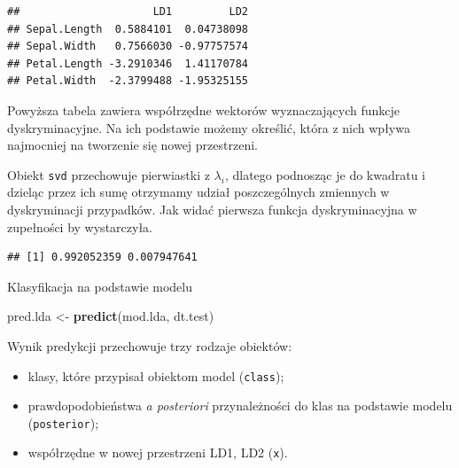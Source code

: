 \documentclass[
]{book}
\newenvironment{Shaded}{\begin{snugshade}}{\end{snugshade}}
\newcommand{\DecValTok}[1]{\textcolor[rgb]{0.00,0.00,0.81}{#1}}
\newcommand{\FunctionTok}[1]{\textcolor[rgb]{0.13,0.29,0.53}{\textbf{#1}}}
\newcommand{\NormalTok}[1]{#1}
\newcommand{\OtherTok}[1]{\textcolor[rgb]{0.56,0.35,0.01}{#1}}
\newcommand{\SpecialCharTok}[1]{\textcolor[rgb]{0.81,0.36,0.00}{\textbf{#1}}}
\providecommand{\tightlist}{%
  \setlength{\itemsep}{0pt}\setlength{\parskip}{0pt}}
\theoremstyle{plain}
\theoremstyle{definition}
\theoremstyle{definition}
\theoremstyle{definition}
\theoremstyle{definition}
\theoremstyle{definition}
\theoremstyle{remark}
\begin{document}
\begin{Shaded}
\end{Shaded}

\begin{verbatim}
##                     LD1         LD2
## Sepal.Length  0.5884101  0.04738098
## Sepal.Width   0.7566030 -0.97757574
## Petal.Length -3.2910346  1.41170784
## Petal.Width  -2.3799488 -1.95325155
\end{verbatim}

Powyższa tabela zawiera współrzędne wektorów wyznaczających funkcje dyskryminacyjne. Na ich podstawie możemy określić, która z nich wpływa najmocniej na tworzenie się nowej przestrzeni.

Obiekt \texttt{svd} przechowuje pierwiastki z \(\lambda_i\), dlatego podnosząc je do kwadratu i dzieląc przez ich sumę otrzymamy udział poszczególnych zmiennych w dyskryminacji przypadków. Jak widać pierwsza funkcja dyskryminacyjna w zupełności by wystarczyła.

\begin{Shaded}
\end{Shaded}

\begin{verbatim}
## [1] 0.992052359 0.007947641
\end{verbatim}

Klasyfikacja na podstawie modelu

\begin{Shaded}
\begin{Highlighting}[]
\NormalTok{pred.lda }\OtherTok{\textless{}{-}} \FunctionTok{predict}\NormalTok{(mod.lda, dt.test)}
\end{Highlighting}
\end{Shaded}

Wynik predykcji przechowuje trzy rodzaje obiektów:

\begin{itemize}
\tightlist
\item
  klasy, które przypisał obiektom model (\texttt{class});
\item
  prawdopodobieństwa \emph{a posteriori} przynależności do klas na podstawie modelu (\texttt{posterior});
\item
  współrzędne w nowej przestrzeni LD1, LD2 (\texttt{x}).
\end{itemize}
\end{document}
